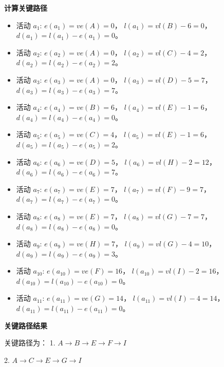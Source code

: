 \documentclass[lang=cn,newtx,10pt,scheme=chinese]{../elegantbook}
\begin{document}
\textbf{计算关键路径}
\begin{itemize}
  \item 活动 $a_1$:  
    $e(a_1) = ve(A) = 0$，  
    $l(a_1) = vl(B) - 6 = 0$，  
    $d(a_1) = l(a_1) - e(a_1) = 0$。

  \item 活动 $a_2$:  
    $e(a_2) = ve(A) = 0$，  
    $l(a_2) = vl(C) - 4 = 2$，  
    $d(a_2) = l(a_2) - e(a_2) = 2$。

  \item 活动 $a_3$:  
    $e(a_3) = ve(A) = 0$，  
    $l(a_3) = vl(D) - 5 = 7$，  
    $d(a_3) = l(a_3) - e(a_3) = 7$。

  \item 活动 $a_4$:  
    $e(a_4) = ve(B) = 6$，  
    $l(a_4) = vl(E) - 1 = 6$，  
    $d(a_4) = l(a_4) - e(a_4) = 0$。

  \item 活动 $a_5$:  
    $e(a_5) = ve(C) = 4$，  
    $l(a_5) = vl(E) - 1 = 6$，  
    $d(a_5) = l(a_5) - e(a_5) = 2$。

  \item 活动 $a_6$:  
    $e(a_6) = ve(D) = 5$，  
    $l(a_6) = vl(H) - 2 = 12$，  
    $d(a_6) = l(a_6) - e(a_6) = 7$。

  \item 活动 $a_7$:  
    $e(a_7) = ve(E) = 7$，  
    $l(a_7) = vl(F) - 9 = 7$，  
    $d(a_7) = l(a_7) - e(a_7) = 0$。

  \item 活动 $a_8$:  
    $e(a_8) = ve(E) = 7$，  
    $l(a_8) = vl(G) - 7 = 7$，  
    $d(a_8) = l(a_8) - e(a_8) = 0$。

  \item 活动 $a_9$:  
    $e(a_9) = ve(H) = 7$，  
    $l(a_9) = vl(G) - 4 = 10$，  
    $d(a_9) = l(a_9) - e(a_9) = 3$。

  \item 活动 $a_{10}$:  
    $e(a_{10}) = ve(F) = 16$，  
    $l(a_{10}) = vl(I) - 2 = 16$，  
    $d(a_{10}) = l(a_{10}) - e(a_{10}) = 0$。

  \item 活动 $a_{11}$:  
    $e(a_{11}) = ve(G) = 14$，  
    $l(a_{11}) = vl(I) - 4 = 14$，  
    $d(a_{11}) = l(a_{11}) - e(a_{11}) = 0$。
\end{itemize}

\textbf{关键路径结果}

关键路径为：  
1. $A \to B \to E \to F \to I$  

2. $A \to C \to E \to G \to I$
\end{document}
